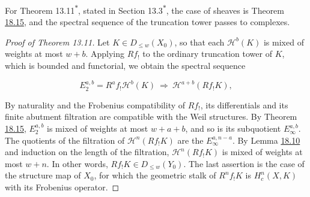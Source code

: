 \documentclass[11pt]{article}
\newcommand{\bpout}[1]{#1\textsuperscript{\hyperlink{bp-outside}{\ensuremath{\ast}}}}
\begin{document}
\label{bp47}%
For Theorem \bpout{13.11}, stated in Section \bpout{13.3}, the case of sheaves is Theorem \hyperref[bp45]{18.15}, and the spectral sequence of the truncation tower passes to complexes.

\begin{proof}[{Proof of Theorem 13.11}]\label{bp48}%
Let \(K\in D_{\le w}(X_0)\), so that each \(\mathcal H^b(K)\) is mixed of weights at most \(w+b\). Applying \(Rf_!\) to the ordinary truncation tower of \(K\), which is bounded and functorial, we obtain the spectral sequence

\[
E_2^{a,b}=R^af_!\mathcal H^b(K)
\ \Longrightarrow\ \mathcal H^{a+b}(Rf_!K),
\]

By naturality and the Frobenius compatibility of \(Rf_!\), its differentials and its finite abutment filtration are compatible with the Weil structures. By Theorem \hyperref[bp45]{18.15}, \(E_2^{a,b}\) is mixed of weights at most \(w+a+b\), and so is its subquotient \(E_\infty^{a,b}\). The quotients of the filtration of \(\mathcal H^n(Rf_!K)\) are the \(E_\infty^{a,n-a}\). By Lemma \hyperref[bp33]{18.10} and induction on the length of the filtration, \(\mathcal H^n(Rf_!K)\) is mixed of weights at most \(w+n\). In other words, \(Rf_!K\in D_{\le w}(Y_0)\). The last assertion is the case of the structure map of \(X_0\), for which the geometric stalk of \(R^nf_!K\) is \(H_c^n(X,K)\) with its Frobenius operator.
\end{proof}



\clearpage{}\hypertarget{bp-outside}{}%
\end{document}
